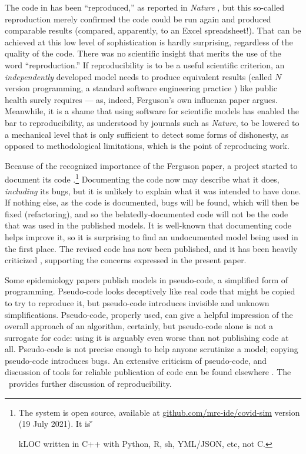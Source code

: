 The code in \cite{nature-summary,ICmodel} has been ``reproduced,'' as reported in \emph{Nature\/} \cite{codecheck,thumbs-up}, but this so-called reproduction merely confirmed the code could be run again and produced comparable results (compared, apparently, to an Excel spreadsheet!). That can be achieved at this low level of sophistication is hardly surprising, regardless of the quality of the code. There was no scientific insight that merits the use of the word ``reproduction.'' If reproducibility is to be a useful scientific criterion, an \emph{independently\/} developed model needs to produce equivalent results (called $N$ version programming, a standard software engineering practice \cite{NVP}) like public health surely requires --- as, indeed, Ferguson's own influenza paper \cite{nvp-ferguson} argues. Meanwhile, it is a shame that using software for scientific models has enabled the bar to reproducibility, as understood by journals such as \emph{Nature}, to be lowered to a mechanical level that is only sufficient to detect some forms of dishonesty, as opposed to methodological limitations, which is the point of reproducing work.

Because of the recognized importance of the Ferguson paper, a project started to document its code  \cite{refactoring}.\footnote{The system is open source, available at \url{github.com/mrc-ide/covid-sim} version (19 July 2021). It is
\newcount\u
\newcount\v
\newcount\w
\newcount\frac

kLOC written in C++ with Python, R, sh, YML/JSON, etc, not C\@.}
Documenting the code now may describe what it does, \emph{including\/} its bugs, but it is unlikely to explain what it was intended to have done. If nothing else, as the code is documented, bugs will be found, which will then be fixed (refactoring), and so the belatedly-documented code will not be the code that was used in the published models. It is well-known that documenting code helps improve it, so it is surprising to find an undocumented model being used in the first place. The revised code has now been published, and it has been heavily criticized , supporting the concerns expressed in the present paper.

Some epidemiology papers  publish models in pseudo-code, a simplified form of programming. Pseudo-code looks deceptively like real code that might be copied to try to reproduce it, but pseudo-code introduces invisible and unknown simplifications. Pseudo-code, properly used, can give a helpful impression of the overall approach of an algorithm, certainly, but pseudo-code alone is not a surrogate for code: using it is arguably even worse than not publishing code at all. Pseudo-code is not precise enough to help anyone scrutinize a model; copying pseudo-code introduces bugs. An extensive criticism of pseudo-code, and discussion of tools for reliable publication of code can be found elsewhere \cite{relit}. {The \supplement\ provides further discussion of reproducibility.}

